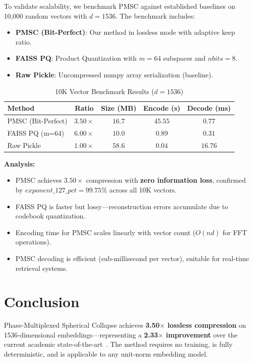 \documentclass[11pt,a4paper]{article}
\begin{document}
To validate scalability, we benchmark PMSC against established baselines on 10,000 random vectors with $d=1536$. The benchmark includes:
\begin{itemize}
\item \textbf{PMSC (Bit-Perfect)}: Our method in lossless mode with adaptive keep ratio.
\item \textbf{FAISS PQ}: Product Quantization with $m=64$ subspaces and $nbits=8$.
\item \textbf{Raw Pickle}: Uncompressed numpy array serialization (baseline).
\end{itemize}

\begin{table}[h]
\centering
\caption{10K Vector Benchmark Results ($d=1536$)}
\label{tab:10k}
\begin{tabular}{lcccc}
\toprule
\textbf{Method} & \textbf{Ratio} & \textbf{Size (MB)} & \textbf{Encode (s)} & \textbf{Decode (ms)} \\
\midrule
PMSC (Bit-Perfect) & $3.50\times$ & $16.7$ & $45.55$ & $0.77$ \\
FAISS PQ (m=64) & $6.00\times$ & $10.0$ & $0.89$ & $0.31$ \\
Raw Pickle & $1.00\times$ & $58.6$ & $0.04$ & $16.76$ \\
\bottomrule
\end{tabular}
\end{table}

\textbf{Analysis:}
\begin{itemize}
\item PMSC achieves $3.50\times$ compression with \textbf{zero information loss}, confirmed by $exponent\_127\_pct = 99.75\%$ across all 10K vectors.
\item FAISS PQ is faster but lossy---reconstruction errors accumulate due to codebook quantization.
\item Encoding time for PMSC scales linearly with vector count ($O(nd)$ for FFT operations).
\item PMSC decoding is efficient (sub-millisecond per vector), suitable for real-time retrieval systems.
\end{itemize}


\section{Conclusion}
\label{sec:conclusion}

Phase-Multiplexed Spherical Collapse achieves \textbf{3.50$\times$ lossless compression} on 1536-dimensional embeddings---representing a \textbf{2.33$\times$ improvement} over the current academic state-of-the-art~\cite{xiao2026lossless}. The method requires no training, is fully deterministic, and is applicable to any unit-norm embedding model.
\end{document}
